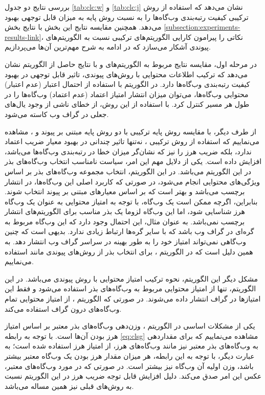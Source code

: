 \documentclass[twoside, a4paper,11pt]{book}
\numberwithin{equation}{chapter}
\numberwithin{table}{chapter}
\numberwithin{figure}{chapter}
\numberwithin{equation}{chapter}
\begin{document}
بررسی نتایج دو جدول \ref{tab:clc:w} و \ref{tab:clc:j} نشان می‌دهد که استفاده از روش ترکیبی  کیفیت رتبه‌بندی وب‌گاه‌ها را به نسبت روش پایه  به میزان قابل توجهی بهبود می‌دهد. 
همچنین مقایسه نتایج این بخش با نتایج بخش \ref{subsection:experiments-results-link}، نکاتی را پیرامون کارایی الگوریتم‌های ترکیبی نسبت به الگوریتم‌های پیوندی آشکار می‌سازد که در ادامه به شرح مهم‌ترین آن‌ها می‌پردازیم.

در مرحله اول، مقایسه نتایج مربوط به الگوریتم‌های  و  با نتایج حاصل از الگوریتم  نشان می‌دهد که ترکیب اطلاعات محتوایی با روش‌های پیوندی، تاثیر قابل توجهی در بهبود کیفیت رتبه‌بندی وب‌گاه‌ها دارد. در الگوریتم    با استفاده از احتمال اعتبار (عدم اعتبار) محتوایی وب‌گاه‌ها، می‌توان میزان انتشار امتیاز اعتماد (عدم اعتماد) وب‌گاه‌ها را در طول هر مسیر کنترل کرد. با استفاده از این روش، از خطای ناشی از وجود یال‌های جعلی در گراف وب کاسته می‌شود.

از طرف دیگر، با مقایسه روش پایه ترکیبی  با دو روش پایه مبتنی بر پیوند   و ، مشاهده می‌نماییم که استفاده از روش ترکیبی ، نه‌تنها تاثیر چندانی در بهبود معیار ضریب اعتماد ندارد، بلکه ضریب هرز را نیز که نشان‌گر میزان خطا در رتبه‌بندی وب‌گاه‌ها می‌باشد، افزایش داده است. یکی از دلایل مهم این امر، سیاست نامناسب انتخاب وب‌گاه‌های بذر در این الگوریتم می‌باشد. در این الگوریتم، انتخاب مجموعه وب‌گاه‌های بذر بر اساس ویژگی‌های محتوایی انجام می‌شود، در صورتی که کاربرد اصلی این وب‌گاه‌ها، در انتشار برچسب می‌باشد و بهتر است که بر اساس معیارهای مبتنی بر پیوند انتخاب شوند. بنابراین، اگرچه ممکن است یک وب‌گاه، با توجه به امتیاز محتوایی به عنوان یک وب‌گاه هرز شناسایی شود، اما این وب‌گاه لزوما یک بذر مناسب برای الگوریتم‌های انتشار برچسب نمی‌باشد. به عنوان مثال، این احتمال وجود دارد که این وب‌گاه مربوط به گره‌ای در گراف وب باشد که با سایر گره‌ها ارتباط زیادی ندارد. بدیهی است که چنین وب‌گاهی نمی‌تواند امتیاز خود را به طور بهینه در سراسر گراف وب انتشار دهد. به همین دلیل است که در الگوریتم ، برای انتخاب بذر از روش‌های پیوندی مانند  استفاده می‌نماییم. 

مشکل دیگر این الگوریتم، نحوه ترکیب امتیاز محتوایی با روش پیوندی می‌باشد. در این الگوریتم، تنها از امتیاز محتوایی مربوط به وب‌گاه‌های بذر استفاده می‌شود و فقط این امتیازها در گراف انتشار داده می‌شوند. در صورتی که الگوریتم ، از امتیاز محتوایی تمام وب‌گاه‌های درون گراف استفاده می‌کند. 

یکی از مشکلات اساسی‌ در الگوریتم ، وزن‌دهی وب‌گاه‌های بذر معتبر بر اساس امتیاز هرز بودن آن‌ها است. با توجه به رابطه \ref{eq:clsg} مشاهده می‌نماییم که برای مقداردهی به وب‌گاه‌های بذر معتبر نیز مانند وب‌گاه‌های  هرز، از امتیاز هرز استفاده شده است؛ به عبارت دیگر، با توجه به این رابطه، هر میزان مقدار هرز بودن یک وب‌گاه معتبر بیشتر باشد، وزن اولیه آن وب‌گاه نیز بیشتر است. در صورتی که در مورد وب‌گاه‌های معتبر، عکس این امر صدق می‌کند. دلیل افزایش قابل توجه ضریب هرز در این الگوریتم نسبت به روش‌های قبلی نیز همین مساله می‌باشد.
\end{document}
